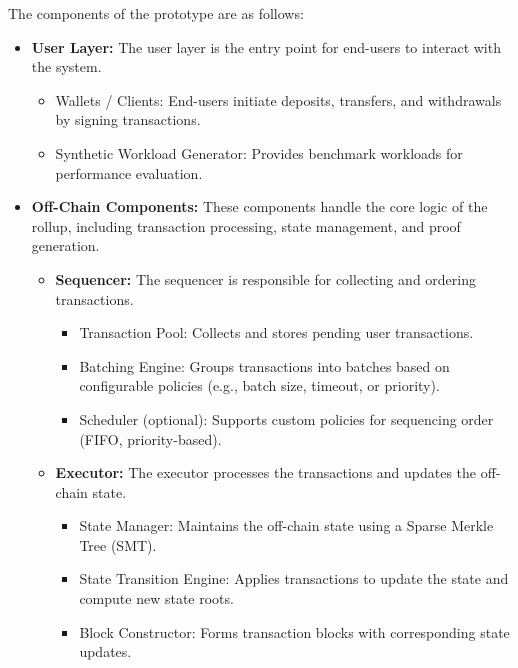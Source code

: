 The components of the prototype are as follows:
\begin{itemize}
    \item \textbf {User Layer:}
    The user layer is the entry point for end-users to interact with the system.
    \begin{itemize}
        \item {Wallets / Clients:} End-users initiate deposits, transfers, and withdrawals by signing transactions.
        \item {Synthetic Workload Generator:} Provides benchmark workloads for performance evaluation.
    \end{itemize}
    
    \item \textbf{Off-Chain Components:}
    These components handle the core logic of the rollup, including transaction processing, state management, and proof generation.
    
    \begin{itemize}
        \item \textbf{Sequencer:}
        The sequencer is responsible for collecting and ordering transactions.
        \begin{itemize}
            \item {Transaction Pool:} Collects and stores pending user transactions.
            \item {Batching Engine:} Groups transactions into batches based on configurable policies (e.g., batch size, timeout, or priority).
            \item {Scheduler (optional):} Supports custom policies for sequencing order (FIFO, priority-based).
        \end{itemize}
        
        \item \textbf{Executor:}
        The executor processes the transactions and updates the off-chain state.
        \begin{itemize}
            \item {State Manager:} Maintains the off-chain state using a Sparse Merkle Tree (SMT).
            \item {State Transition Engine:} Applies transactions to update the state and compute new state roots.
            \item {Block Constructor:} Forms transaction blocks with corresponding state updates.
        \end{itemize}
        

\end{itemize}
\end{itemize}
